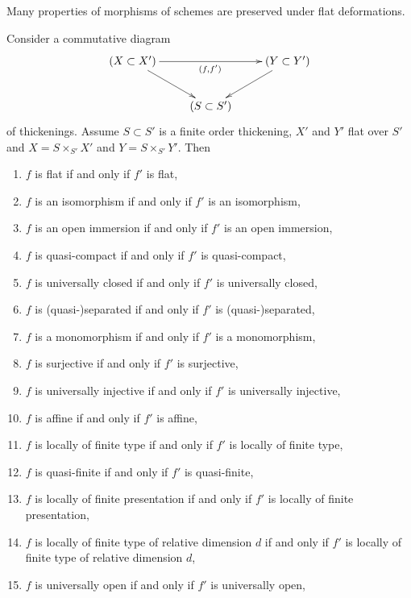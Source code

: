 \noindent
Many properties of morphisms of schemes are preserved under flat
deformations.

\begin{lemma}
\label{lemma-deform-property}
Consider a commutative diagram
$$
\xymatrix{
(X \subset X') \ar[rr]_{(f, f')} \ar[rd] & & (Y \subset Y') \ar[ld] \\
& (S \subset S')
}
$$
of thickenings. Assume $S \subset S'$ is a finite order thickening,
$X'$ and $Y'$ flat over $S'$ and $X = S \times_{S'} X'$ and
$Y = S \times_{S'} Y'$. Then
\begin{enumerate}
\item $f$ is flat if and only if $f'$ is flat,
\label{item-flat}
\item $f$ is an isomorphism if and only if $f'$ is an isomorphism,
\label{item-isomorphism}
\item $f$ is an open immersion if and only if $f'$ is an open immersion,
\label{item-open-immersion}
\item $f$ is quasi-compact if and only if $f'$ is quasi-compact,
\label{item-quasi-compact}
\item $f$ is universally closed if and only if $f'$ is universally closed,
\label{item-universally-closed}
\item $f$ is (quasi-)separated if and only if $f'$ is (quasi-)separated,
\label{item-separated}
\item $f$ is a monomorphism if and only if $f'$ is a monomorphism,
\label{item-monomorphism}
\item $f$ is surjective if and only if $f'$ is surjective,
\label{item-surjective}
\item $f$ is universally injective if and only if $f'$ is universally injective,
\label{item-universally-injective}
\item $f$ is affine if and only if $f'$ is affine,
\label{item-affine}
\item
\label{item-finite-type}
$f$ is locally of finite type if and only if $f'$ is locally of finite type,
\item $f$ is quasi-finite if and only if $f'$ is quasi-finite,
\label{item-quasi-finite}
\item
\label{item-finite-presentation}
$f$ is locally of finite presentation if and only if $f'$ is locally of
finite presentation,
\item
\label{item-relative-dimension-d}
$f$ is locally of finite type of relative dimension $d$ if and only if
$f'$ is locally of finite type of relative dimension $d$,
\item $f$ is universally open if and only if $f'$ is universally open,

\end{enumerate}
\end{lemma}
